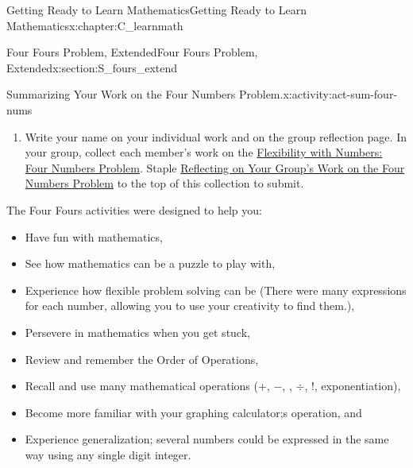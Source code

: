\documentclass[oneside,10pt,]{book}
\numberwithin{equation}{chapter}
\begin{document}
\begin{chapterptx}{Getting Ready to Learn Mathematics}{}{Getting Ready to Learn Mathematics}{}{}{x:chapter:C_learnmath}
\begin{sectionptx}{Four Fours Problem, Extended}{}{Four Fours Problem, Extended}{}{}{x:section:S_fours_extend}
\begin{activity}{Summarizing Your Work on the Four Numbers Problem.}{x:activity:act-sum-four-nums}
\begin{enumerate}[font=\bfseries,label=(\alph*),ref=\alph*]
\begin{itemize}[label=\textbullet]
\item{}\hyperref[x:worksheet:act-organize]{Organizing Your Work: Ways to Use 1, 2, or 3 Fours to Make Other Numbers}, and%
\item{}\hyperref[x:worksheet:act-four-nums-prob]{Flexibility with Numbers: Four Numbers Problem}%
\end{itemize}
%
\item{}Write your name on your individual work and on the group reflection page. In your group, collect each member's work on the \hyperref[x:worksheet:act-four-nums-prob]{Flexibility with Numbers: Four Numbers Problem}. Staple \hyperref[x:worksheet:act-reflect-fournums]{Reflecting on Your Group's Work on the Four Numbers Problem} to the top of this collection to submit.%
\end{enumerate}
The Four Fours activities were designed to help you:%
\begin{itemize}[label=\textbullet]
\item{}Have fun with mathematics,%
\item{}See how mathematics can be a puzzle to play with,%
\item{}Experience how flexible problem solving can be (There were many expressions for each number, allowing you to use your creativity to find them.),%
\item{}Persevere in mathematics when you get stuck,%
\item{}Review and remember the Order of Operations,%
\item{}Recall and use many mathematical operations (+, \(-\), \texttimes{}, \(\div\), !, exponentiation),%
\item{}Become more familiar with your graphing calculator;s operation, and%
\item{}Experience generalization; several numbers could be expressed in the same way using any single digit integer.%
\end{itemize}
%
\par

\end{activity}
\end{sectionptx}
\end{chapterptx}
\end{document}
